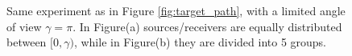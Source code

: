 \begin{figure}[htp]
  \centering
  \caption{Same experiment as in Figure \ref{fig:target_path}, with a limited angle of view
    $\gamma=\pi$. In Figure(a) sources/receivers are equally distributed between $[0,\gamma)$, while
    in Figure(b) they are divided into 5 groups.}
  \label{fig:target_path_lim_aov}
\end{figure}

